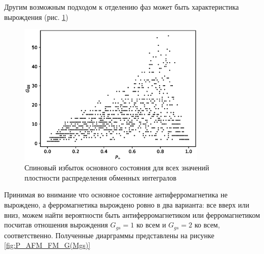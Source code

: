 \documentclass[utf8, babel, sor, jor, amsmath, amssymb, reprint]{elsarticle} %
\begin{document}
Другим возможным подходом к отделению фаз может быть характеристика вырождения (рис. \ref{fig:Ggs})

\begin{figure}[H]
	\centering
	\includegraphics[width=0.8\textwidth]{images/Ggs.eps}
	\caption{Спиновый избыток основного состояния для всех значений плостности распределения обменных интегралов}
	\label{fig:Ggs}
\end{figure}

Принимая во внимание что основное состояние антиферромагнетика не вырождено, а ферромагнетика вырождено ровно в два варианта: все вверх или вниз, можем найти вероятности быть антиферромагнетиком или ферромагнетиком посчитав отношения вырождения $G_{gs} = 1$ ко всем и $G_{gs} = 2$ ко всем, соответственно. Полученные диарграммы представлены на рисунке \ref{fig:P_AFM_FM_G(Mgs)}
\end{document}
